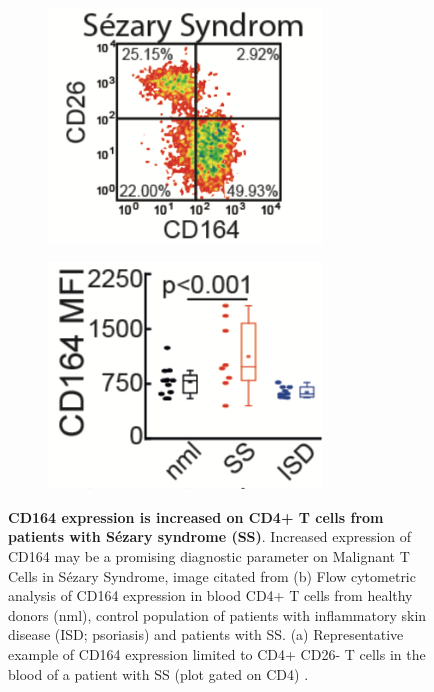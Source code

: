 \begin{figure}[t]
	\begin{center}
		\begin{subfigure}[b]{0.49\textwidth}
		    \centering
			\includegraphics[width=0.8\textwidth]{thesis-template-master/images/cd164.png}
			\label{fig:cellnet}
            \caption{}
		\end{subfigure}
        \begin{subfigure}[b]{0.49\textwidth}
		    \centering
			\includegraphics[width=0.8\textwidth]{thesis-template-master/images/sezary and cd164.png}
			\label{fig:cellnet}
            \caption{}
		\end{subfigure}
	\end{center}
	\caption{\textbf{CD164 expression is increased on CD4+ T cells from patients with Sézary syndrome (SS)}.  Increased expression of CD164 may be a promising diagnostic parameter on Malignant T Cells in Sézary Syndrome, image citated from \cite{emma}
(b) Flow cytometric analysis of CD164 expression in blood CD4+ T cells from healthy donors (nml), control population of patients with inflammatory skin disease (ISD; psoriasis) and patients with SS. (a) Representative example of CD164 expression limited to CD4+ CD26- T cells in the blood of a patient with SS (plot gated on CD4) \cite{emma}.}
\end{figure}

